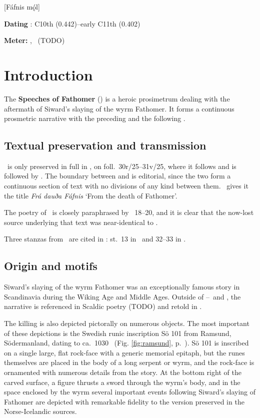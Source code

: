 [Fáfnis mǫ́l]

\begin{flushright}%
\textbf{Dating} \parencite{Sapp2022}: C10th (0.442)--early C11th (0.402)

\textbf{Meter:} \Ljodahattr, \Fornyrdislag\ (TODO)%
\end{flushright}

\section{Introduction}

The \textbf{Speeches of Fathomer} (\Fafnismal) is a heroic prosimetrum dealing with the aftermath of Siward’s slaying of the wyrm Fathomer.  It forms a continuous prosmetric narrative with the preceding  and the following .

\subsection{Textual preservation and transmission}

\Fafnismal\ is only preserved in full in \Regius, on foll.~30r/25--31v/25, where it follows  and is followed by .  The boundary between  and  is editorial, since the two form a continuous section of text with no divisions of any kind between them.  \Regius\ gives it the title \emph{Frá dauða Fáfnis} ‘From the death of Fathomer’.

The poetry of \Fafnismal\ is closely paraphrased by \VolsungaSaga\ 18--20, and it is clear that the now-lost source underlying that text was near-identical to \Regius.

Three stanzas from \Fafnismal\ are cited in \SnorraEdda: st.~13 in \Gylfaginning\ and 32--33 in \Skaldskaparmal.

\subsection{Origin and motifs}

Siward’s slaying of the wyrm Fathomer was an exceptionally famous story in Scandinavia during the Wiking Age and Middle Ages.  Outside of --\Fafnismal\ and \VolsungaSaga, the narrative is referenced in Scaldic poetry (TODO) and retold in \Skaldskaparmal.

The killing is also depicted pictorally on numerous objects.  The most important of these depictions is the Swedish runic inscription Sö 101 from Ramsund, Södermanland, dating to ca.~1030 \ce\ (Fig. \ref{fig:ramsund}, p.~\pageref{fig:ramsund}).  Sö 101 is inscribed on a single large, flat rock-face with a generic memorial epitaph, but the runes themselves are placed in the body of a long serpent or wyrm, and the rock-face is ornamented with numerous details from the story.  At the bottom right of the carved surface, a figure thrusts a sword through the wyrm’s body, and in the space enclosed by the wyrm several important events following Siward’s slaying of Fathomer are depicted with remarkable fidelity to the version preserved in the Norse-Icelandic sources.

